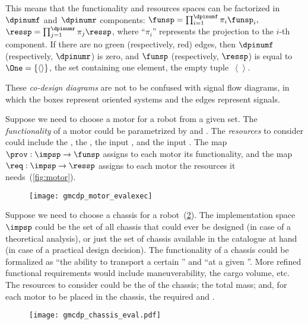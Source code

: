 This means that the functionality and resources spaces
can be factorized in~$\dpinumf$ and~$\dpinumr$ components: $\funsp=\prod_{i=1}^{\dpinumf}\pi_{i}\funsp_{i},$
$\ressp=\prod_{j=1}^{\dpinumr}\pi_{j}\ressp$, where ``$\pi_{i}$''
represents the projection to the $i$-th component. If there are no
green (respectively, red) edges, then $\dpinumf$ (respectively, $\dpinumr$)
is zero, and $\funsp$ (respectively, $\ressp$) is equal to~$\One=\{\left\langle \right\rangle \}$,
the set containing one element, the empty tuple~$\left\langle \right\rangle $.

These \emph{co-design diagrams} are not to be confused with signal
flow diagrams, in which the boxes represent oriented systems and the
edges represent signals.


\begin{example}
  \label{exa:motor}Suppose we need to choose a motor for a robot from
  a given set. The \emph{functionality} of a motor could be parametrized
  by  and . The \emph{resources} to consider
  could include the , the , the
  input , and the input .
  The map~$\prov:\impsp\rightarrow\funsp$ assigns to each motor its
  functionality, and the map~$\req:\impsp\rightarrow\ressp$ assigns
  to each motor the resources it needs~(\cref{fig:motor}).
\end{example}

\begin{figure}[h]
  \centering
  \texttt{[image: gmcdp\_motor\_evalexec]}
  \caption{\label{fig:motor_evalexec}}
\end{figure}


\begin{example}
  \label{exa:chassis}Suppose we need to choose a chassis for a robot~(\cref{fig:gmcdp_chassis_eval}).
  The implementation space~$\impsp$ could be the set of all chassis
  that could ever be designed (in case of a theoretical analysis), or
  just the set of chassis available in the catalogue at hand (in case
  of a practical design decision). The functionality of a chassis could
  be formalized as ``the ability to transport a certain '' and ``at a given ''. More refined
  functional requirements would include maneuverability, the cargo volume,
  etc. The resources to consider could be the  of
  the chassis; the total mass; and, for each motor to be placed in the
  chassis, the required  and .
\end{example}
\begin{figure}[h]
  \centering
  \texttt{[image: gmcdp\_chassis\_eval.pdf]}
  \caption{\label{fig:gmcdp_chassis_eval}}
\end{figure}

